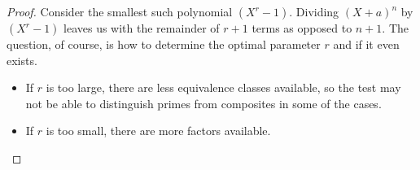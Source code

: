 \documentclass[../main.tex]{subfiles}
\begin{document}
\begin{proof}
Consider the smallest such polynomial $(X^{r} - 1)$. Dividing $(X + a)^{n}$ by $(X^{r} - 1)$ leaves us with the remainder of $r + 1$ terms as opposed to $n + 1$. The question, of course, is how to determine the optimal parameter $r$ and if it even exists.

\begin{itemize}
    \item If $r$ is too large, there are less equivalence classes available, so the test may not be able to distinguish primes from composites in some of the cases.
    \item If $r$ is too small, there are more factors available.
\end{itemize}

\end{proof}
\end{document}
